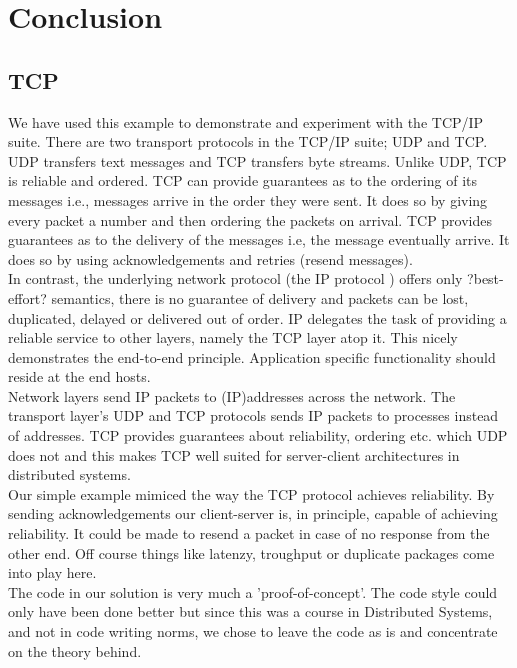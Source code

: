 \chapter{Conclusion}
\minitoc
\section{TCP}

We have used this example to demonstrate and experiment with the TCP/IP suite. There are two transport protocols in the TCP/IP suite; UDP and TCP. UDP transfers text messages and TCP transfers byte streams. Unlike UDP, TCP is reliable and ordered. TCP can provide guarantees as to the ordering of its messages i.e., messages arrive in the order they were sent. It does so by giving every packet a number and then ordering the packets on arrival. TCP provides guarantees as to the delivery of the messages i.e, the message eventually arrive. It does so by using acknowledgements and retries (resend messages).   \\

In contrast, the underlying network protocol (the IP protocol ) offers only ?best-effort? semantics, there is no guarantee of delivery and packets can be lost, duplicated, delayed or delivered out of order. IP delegates the task of providing a reliable service to other layers, namely the TCP layer atop it. This nicely demonstrates the end-to-end principle. Application specific functionality should reside at the end hosts.\\

Network layers send IP packets to (IP)addresses across the network. The transport layer's UDP and TCP protocols sends IP packets to processes instead of addresses. TCP provides guarantees about reliability, ordering etc. which UDP does not and this makes TCP well suited for server-client architectures in distributed systems. \\

Our simple example mimiced the way the TCP protocol achieves reliability. By sending acknowledgements our client-server is, in principle, capable of achieving reliability. It could be made to resend a packet in case of no response from the other end. Off course things like latenzy, troughput or duplicate packages come into play here. \\

The code in our solution is very much a 'proof-of-concept'. The code style could only have been done better but since this was a course in Distributed Systems, and not in code writing norms, we chose to leave the code as is and concentrate on the theory behind.  \\


